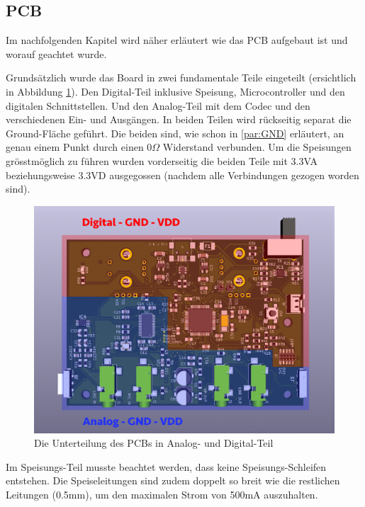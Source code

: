 \subsection{PCB}
\label{sec:PCB}

Im nachfolgenden Kapitel wird näher erläutert wie das PCB aufgebaut ist und worauf geachtet wurde.

Grundsätzlich wurde das Board in zwei fundamentale Teile eingeteilt (ersichtlich in Abbildung \ref{fig:PCB_GNDVDD}).  Den Digital-Teil inklusive Speisung, Microcontroller und den digitalen Schnittstellen. Und den Analog-Teil mit dem Codec und den verschiedenen Ein- und Ausgängen. In beiden Teilen wird rückseitig separat die Ground-Fläche geführt. Die beiden sind, wie schon in \ref{par:GND} erläutert, an genau einem Punkt durch einen $0\Omega$ Widerstand verbunden. Um die Speisungen grösstmöglich zu führen wurden vorderseitig die beiden Teile mit 3.3VA beziehungsweise 3.3VD ausgegossen (nachdem alle Verbindungen gezogen worden sind).

\begin{figure} [H]
\begin{center}
 \includegraphics[scale=0.37]{../graphics/PCB-Layout_GNDVDD.jpg}
 \caption{Die Unterteilung des PCBs in Analog- und Digital-Teil}
\label{fig:PCB_GNDVDD}
\end{center}
\end{figure}

Im Speisungs-Teil musste beachtet werden, dass keine Speisungs-Schleifen entstehen. Die  Speiseleitungen sind zudem doppelt so breit wie die restlichen Leitungen (0.5mm), um den maximalen Strom von 500mA auszuhalten.

